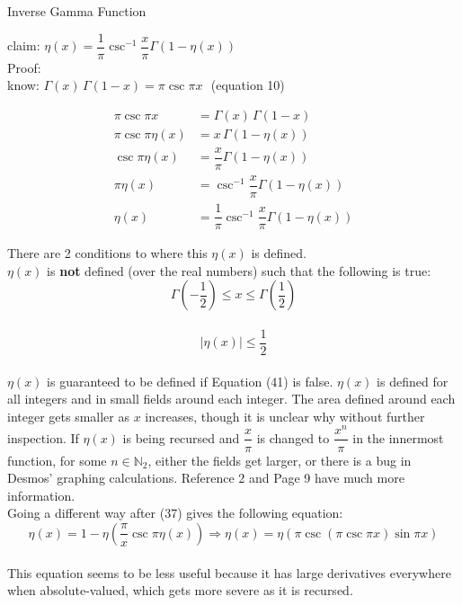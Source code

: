 \documentclass[12pt]{article}
\begin{document}
\pagebreak\begin{section}{Inverse Gamma Function}\label{sec:inverse gamma}
	
	claim: $\eta(x)=\dfrac1\pi\csc^{-1}\dfrac x\pi\Gamma(1-\eta(x))$\\
	Proof:\\
	know: $\Gamma(x)\,\Gamma(1-x)=\pi\csc\pi x~~~$(equation 10)

	\begin{align} %
		\pi\csc\pi x & =\Gamma(x)\,\Gamma(1-x)\\
		\pi\csc\pi\eta(x) & =x\,\Gamma(1-\eta(x))\\
		\csc\pi\eta(x) & =\dfrac x\pi\Gamma(1-\eta(x))\\
		\pi\eta(x) & =\csc^{-1}\dfrac x\pi\Gamma(1-\eta(x))\\
		\eta(x) & =\dfrac1\pi\csc^{-1}\dfrac x\pi\Gamma(1-\eta(x))
	\end{align}

	\noindent\blacksquare

	\noindent There are 2 conditions to where this $\eta(x)$ is defined.\\
	$\eta(x)$ is \textbf{not} defined (over the real numbers) such that the following is true:\\
	\begin{equation}
		\Gamma\!\left(-\frac12\right)\le x\le\Gamma\!\left(\frac12\right)
	\end{equation}\\ %
	\begin{equation*}
		|\eta(x)|\le\frac12
	\end{equation*}\\

	$\eta(x)$ is guaranteed to be defined if Equation (41) is false. $\eta(x)$ is defined for
	all integers and in small fields around each integer. The area defined around each integer
	gets smaller as $x$ increases, though it is unclear why without further inspection. If
	$\eta(x)$ is being recursed and $\dfrac x\pi$ is changed to $\dfrac{x^n}\pi$ in the
	innermost function, for some $n\in\mathbb N_2$, either the fields get larger, or there is
	a bug in Desmos' graphing calculations. Reference 2 and Page 9 have much more information.\\
	Going a different way after (37) gives the following equation:\\
	\begin{equation}
		\eta(x)=1-\eta\left(\dfrac\pi x\csc\pi\eta(x)\right)\Longrightarrow\eta(x)=\eta(\pi
		\csc(\pi\csc\pi x)\sin\pi x)
	\end{equation}\\ %
	This equation seems to be less useful because it has large derivatives everywhere when
	absolute-valued, which gets more severe as it is recursed.
\end{section}
\end{document}
